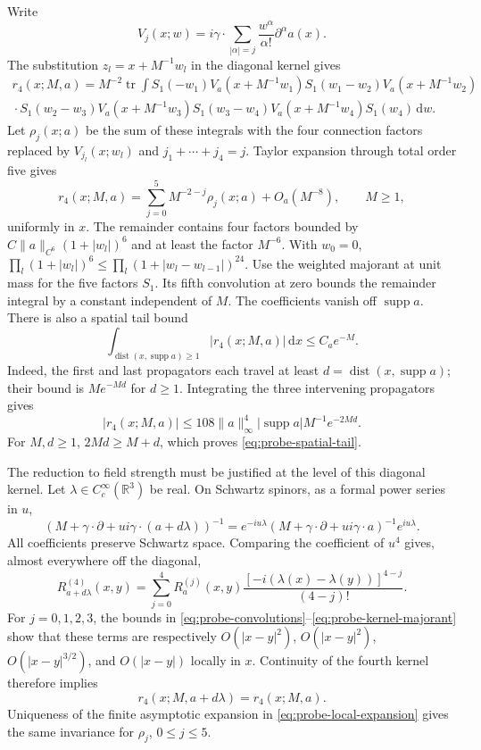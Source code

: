 \documentclass[11pt,letterpaper,reqno]{amsart}
\newcommand{\R}{\mathbb R}
\newcommand{\dd}{\mathrm d}
\DeclareMathOperator{\supp}{supp}
\DeclareMathOperator{\tr}{tr}
\begin{document}
Write
\[
 V_j(x;w)=i\gamma\cdot\sum_{|\alpha|=j}
                  \frac{w^\alpha}{\alpha!}\partial^\alpha a(x).
\]
The substitution $z_l=x+M^{-1}w_l$ in the diagonal kernel gives
\begin{multline}\label{eq:probe-scaled-kernel}
 r_4(x;M,a)=M^{-2}\tr\int S_1(-w_1)V_a(x+M^{-1}w_1)
 S_1(w_1-w_2)V_a(x+M^{-1}w_2)\\
 {}\cdot S_1(w_2-w_3)V_a(x+M^{-1}w_3)
 S_1(w_3-w_4)V_a(x+M^{-1}w_4)S_1(w_4)\,\dd w.
\end{multline}
Let $\rho_j(x;a)$ be the sum of these integrals with the four
connection factors replaced by $V_{j_l}(x;w_l)$ and
$j_1+\cdots+j_4=j$. Taylor expansion through total order five gives
\begin{equation}\label{eq:probe-local-expansion}
 r_4(x;M,a)=\sum_{j=0}^5M^{-2-j}\rho_j(x;a)+O_a(M^{-8}),
 \qquad M\ge1,
\end{equation}
uniformly in $x$. The remainder contains four factors bounded by
$C\|a\|_{C^6}(1+|w_l|)^6$ and at least the factor $M^{-6}$.
With $w_0=0$,
$\prod_l(1+|w_l|)^6\le\prod_l(1+|w_l-w_{l-1}|)^{24}$.
Use the weighted majorant at unit mass for the five factors $S_1$.
Its fifth convolution at zero bounds the remainder integral by a
constant independent of $M$.
The coefficients vanish off $\supp a$. There is also a spatial tail
bound
\begin{equation}\label{eq:probe-spatial-tail}
 \int_{\operatorname{dist}(x,\supp a)\ge1}|r_4(x;M,a)|\,\dd x
 \le C_ae^{-M}.
\end{equation}
Indeed, the first and last propagators each travel at least
$d=\operatorname{dist}(x,\supp a)$; their bound is $Me^{-Md}$ for
$d\ge1$. Integrating the three intervening propagators gives
\[
 |r_4(x;M,a)|\le108\|a\|_\infty^4|\supp a|M^{-1}e^{-2Md}.
\]
For $M,d\ge1$, $2Md\ge M+d$, which proves
\eqref{eq:probe-spatial-tail}.

The reduction to field strength must be justified at the level of this
diagonal kernel. Let $\lambda\in C_c^\infty(\R^3)$ be real. On Schwartz
spinors, as a formal power series in $u$,
\[
 (M+\gamma\cdot\partial+ui\gamma\cdot(a+d\lambda))^{-1}
 =e^{-iu\lambda}(M+\gamma\cdot\partial+ui\gamma\cdot a)^{-1}
                       e^{iu\lambda}.
\]
All coefficients preserve Schwartz space. Comparing the coefficient
of $u^4$ gives, almost everywhere off the diagonal,
\begin{equation}\label{eq:probe-gauge-kernel}
 R_{a+d\lambda}^{(4)}(x,y)=\sum_{j=0}^4R_a^{(j)}(x,y)
       \frac{[-i(\lambda(x)-\lambda(y))]^{4-j}}{(4-j)!}.
\end{equation}
For $j=0,1,2,3$, the bounds in
\eqref{eq:probe-convolutions}--\eqref{eq:probe-kernel-majorant} show
that these terms are respectively $O(|x-y|^2)$,
$O(|x-y|^2)$, $O(|x-y|^{3/2})$, and $O(|x-y|)$ locally in $x$.
Continuity of the fourth kernel therefore implies
\[
 r_4(x;M,a+d\lambda)=r_4(x;M,a).
\]
Uniqueness of the finite asymptotic expansion in
\eqref{eq:probe-local-expansion} gives the same invariance for
$\rho_j$, $0\le j\le5$.
\end{document}
